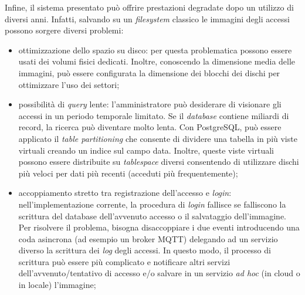 Infine, il sistema presentato può offrire prestazioni degradate dopo un utilizzo di diversi anni. Infatti, salvando su un \textit{filesystem} classico le immagini degli accessi possono sorgere diversi problemi:
\begin{itemize}
    \item ottimizzazione dello spazio su disco: per questa problematica possono essere usati dei volumi fisici dedicati. Inoltre, conoscendo la dimensione media delle immagini, può essere configurata la dimensione dei blocchi dei dischi per ottimizzare l'uso dei settori;
    \item possibilità di \textit{query} lente: l'amministratore può desiderare di visionare gli accessi in un periodo temporale limitato. Se il \textit{database} contiene miliardi di record, la ricerca può diventare molto lenta. Con PostgreSQL, può essere applicato il \textit{table partitioning} che consente di dividere una tabella in più viste virtuali creando un indice sul campo data. Inoltre, queste viste virtuali possono essere distribuite su \textit{tablespace} diversi consentendo di utilizzare dischi più veloci per dati più recenti (acceduti più frequentemente);
    \item accoppiamento stretto tra registrazione dell'accesso e \textit{login}: nell'implementazione corrente, la procedura di \textit{login} fallisce se falliscono la scrittura del database dell'avvenuto accesso o il salvataggio dell'immagine. Per risolvere il problema, bisogna disaccoppiare i due eventi introducendo una coda asincrona (ad esempio un broker MQTT) delegando ad un servizio diverso la scrittura dei \textit{log} degli accessi. In questo modo, il processo di scrittura può essere più complicato e notificare altri servizi dell'avvenuto/tentativo di accesso e/o salvare in un servizio \textit{ad hoc} (in cloud o in locale) l'immagine;
\end{itemize}

\clearpage




